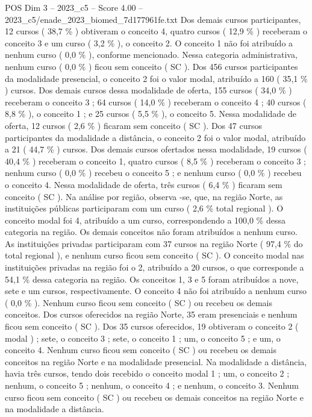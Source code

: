\begin{textsample}{POS Dim 3 – 2023\_c5 – Score 4.00 – 2023\_c5/enade\_2023\_biomed\_7d177961fe.txt}
Dos demais cursos participantes, 12 cursos ( 38,7 \% ) obtiveram o conceito 4, quatro cursos ( 12,9 \% ) receberam o conceito 3 e um curso ( 3,2 \% ), o conceito 2.
O conceito 1 não foi atribuído a nenhum curso ( 0,0 \% ), conforme mencionado.
Nessa categoria administrativa, nenhum curso ( 0,0 \% ) ficou sem conceito ( SC ).
Dos 456 cursos participantes da modalidade presencial, o conceito 2 foi o valor modal, atribuído a 160 ( 35,1 \% ) cursos.
Dos demais cursos dessa modalidade de oferta, 155 cursos ( 34,0 \% ) receberam o conceito 3 ; 64 cursos ( 14,0 \% ) receberam o conceito 4 ; 40 cursos ( 8,8 \% ), o conceito 1 ; e 25 cursos ( 5,5 \% ), o conceito 5.
Nessa modalidade de oferta, 12 cursos ( 2,6 \% ) ficaram sem conceito ( SC ).
Dos 47 cursos participantes da modalidade a distância, o conceito 2 foi o valor modal, atribuído a 21 ( 44,7 \% ) cursos.
Dos demais cursos ofertados nessa modalidade, 19 cursos ( 40,4 \% ) receberam o conceito 1, quatro cursos ( 8,5 \% ) receberam o conceito 3 ; nenhum curso ( 0,0 \% ) recebeu o conceito 5 ; e nenhum curso ( 0,0 \% ) recebeu o conceito 4.
Nessa modalidade de oferta, três cursos ( 6,4 \% ) ficaram sem conceito ( SC ).
Na análise por região, observa -se, que, na região Norte, as instituições públicas participaram com um curso ( 2,6 \% total regional ).
O conceito modal foi 4, atribuído a um curso, correspondendo a 100,0 \% dessa categoria na região.
Os demais conceitos não foram atribuídos a nenhum curso.
As instituições privadas participaram com 37 cursos na região Norte ( 97,4 \% do total regional ), e nenhum curso ficou sem conceito ( SC ).
O conceito modal nas instituições privadas na região foi o 2, atribuído a 20 cursos, o que corresponde a 54,1 \% dessa categoria na região.
Os conceitos 1, 3 e 5 foram atribuídos a nove, sete e um cursos, respectivamente.
O conceito 4 não foi atribuído a nenhum curso ( 0,0 \% ).
Nenhum curso ficou sem conceito ( SC ) ou recebeu os demais conceitos.
Dos cursos oferecidos na região Norte, 35 eram presenciais e nenhum ficou sem conceito ( SC ).
Dos 35 cursos oferecidos, 19 obtiveram o conceito 2 ( modal ) ; sete, o conceito 3 ; sete, o conceito 1 ; um, o conceito 5 ; e um, o conceito 4.
Nenhum curso ficou sem conceito ( SC ) ou recebeu os demais conceitos na região Norte e na modalidade presencial.
Na modalidade a distância, havia três cursos, tendo dois recebido o conceito modal 1 ; um, o conceito 2 ; nenhum, o conceito 5 ; nenhum, o conceito 4 ; e nenhum, o conceito 3.
Nenhum curso ficou sem conceito ( SC ) ou recebeu os demais conceitos na região Norte e na modalidade a distância.

\end{textsample}
